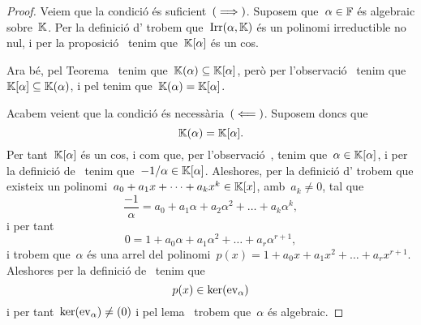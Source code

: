 \documentclass[../teoria-de-Galois.tex]{subfiles}
\begin{document}
    \begin{proof} %
        Veiem que la condició és suficient~\((\implies)\).
        Suposem que~\(\alpha\in\mathbb{F}\) és algebraic sobre~\(\mathbb{K}\).
        Per la definició d' trobem que~\(\operatorname{Irr}(\alpha,\mathbb{K})\) és un polinomi irreductible no nul, i per la proposició~ tenim que~\(\mathbb{K}[\alpha]\) és un cos.

        Ara bé, pel Teorema~ tenim que~\(\mathbb{K}(\alpha)\subseteq\mathbb{K}[\alpha]\), però per l'observació~ tenim que~\(\mathbb{K}[\alpha]\subseteq\mathbb{K}(\alpha)\), i pel  tenim que~\(\mathbb{K}(\alpha)=\mathbb{K}[\alpha]\).

        Acabem veient que la condició és necessària~\((\impliedby)\).
        Suposem doncs que
        \[
            \mathbb{K}(\alpha)=\mathbb{K}[\alpha].
        \]
        Per tant~\(\mathbb{K}[\alpha]\) és un cos, i com que, per l'observació~, tenim que~\(\alpha\in\mathbb{K}[\alpha]\), i per la definició de~ tenim que~\(-1/\alpha\in\mathbb{K}[\alpha]\).
        Aleshores, per la definició d' trobem que existeix un polinomi~\(a_{0}+a_{1}x+\dots+a_{k}x^{k}\in\mathbb{K}[x]\), amb~\(a_{k}\neq0\), tal que
        \[
            \frac{-1}{\alpha}=a_{0}+a_{1}\alpha+a_{2}\alpha^{2}+\dots+a_{k}\alpha^{k},
        \]
        i per tant
        \[
            0=1+a_{0}\alpha+a_{1}\alpha^{2}+\dots+a_{r}\alpha^{r+1},
        \]
        i trobem que~\(\alpha\) és una arrel del polinomi~\(p(x)=1+a_{0}x+a_{1}x^{2}+\dots+a_{r}x^{r+1}\).
        Aleshores per la definició de~ tenim que
        \[
            p(x)\in\operatorname{ker}(\mathrm{ev}_{\alpha})
        \]
        i per tant~\(\operatorname{ker}(\mathrm{ev}_{\alpha})\neq(0)\) i pel lema~ trobem que~\(\alpha\) és algebraic.
    \end{proof}
\end{document}
